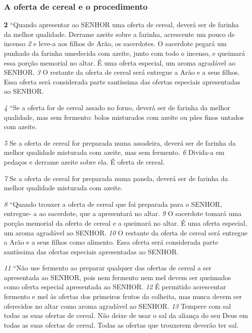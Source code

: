 \bigskip
\subsubsection*{A oferta de cereal e o procedimento}
\textbf{\large 2} “Quando apresentar ao SENHOR uma oferta de cereal, deverá ser de farinha da
melhor qualidade. Derrame azeite sobre a farinha, acrescente um pouco de
incenso 
\textit{\tiny 2} 
e leve-a aos filhos de Arão, os sacerdotes. O sacerdote pegará um
punhado da farinha umedecida com azeite, junto com todo o incenso, e queimará
essa porção memorial no altar. É uma oferta especial, um aroma agradável ao
SENHOR. 
\textit{\tiny 3} 
O restante da oferta de cereal será entregue a Arão e a seus filhos. Essa
oferta será considerada parte santíssima das ofertas especiais apresentadas ao
SENHOR. 

\smallskip
\textit{\tiny 4} 
“Se a oferta for de cereal assado no forno, deverá ser de farinha da melhor
qualidade, mas sem fermento: bolos misturados com azeite ou pães finos untados
com azeite. 

\smallskip
\textit{\tiny 5} 
Se a oferta de cereal for preparada numa assadeira, deverá ser de
farinha da melhor qualidade misturada com azeite, mas sem fermento. 
\textit{\tiny 6} 
Divida-a
em pedaços e derrame azeite sobre ela. É oferta de cereal. 

\smallskip
\textit{\tiny 7} 
Se a oferta de cereal
for preparada numa panela, deverá ser de farinha da melhor qualidade misturada
com azeite. 

\smallskip
\textit{\tiny 8} 
“Quando trouxer a oferta de cereal que foi preparada para o SENHOR, entregue-
a ao sacerdote, que a apresentará no altar. 
\textit{\tiny 9} 
O sacerdote tomará uma porção
memorial da oferta de cereal e a queimará no altar. É uma oferta especial, um
aroma agradável ao SENHOR. 
\textit{\tiny 10}
O restante da oferta de cereal será entregue a Arão
e a seus filhos como alimento. Essa oferta será considerada parte santíssima das
ofertas especiais apresentadas ao SENHOR.
   
\smallskip
\textit{\tiny 11}
“Não use fermento ao preparar qualquer das ofertas de cereal a ser
apresentada ao SENHOR, pois nem fermento nem mel devem ser queimados como
oferta especial apresentada ao SENHOR. 
\textit{\tiny 12}
É permitido acrescentar fermento e mel
às ofertas dos primeiros frutos da colheita, mas nunca devem ser oferecidos no
altar como aroma agradável ao SENHOR. 
\textit{\tiny 13}
Tempere com sal todas as suas ofertas
de cereal. Não deixe de usar o sal da aliança do seu Deus em todas as suas ofertas
de cereal. Todas as ofertas que trouxerem deverão ter sal.

